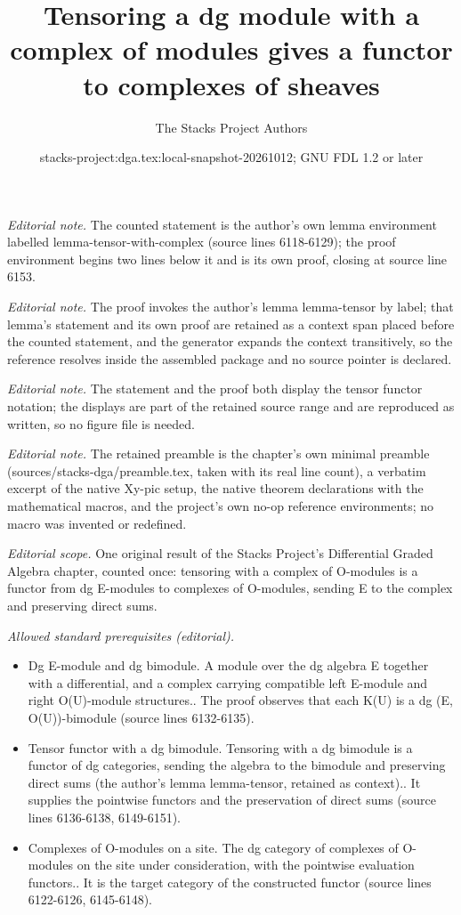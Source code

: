 \documentclass{stacks-project}
\title{Tensoring a dg module with a complex of modules gives a functor to complexes of sheaves}
\author{The Stacks Project Authors}
\date{stacks-project:dga.tex:local-snapshot-20261012; GNU FDL 1.2 or later}
\theoremstyle{plain}
\theoremstyle{definition}
\theoremstyle{remark}
\numberwithin{equation}{subsection}
\begin{document}
\maketitle
\noindent\textit{Editorial note.} The counted statement is the author's own lemma environment labelled lemma-tensor-with-complex (source lines 6118-6129); the proof environment begins two lines below it and is its own proof, closing at source line 6153.\par\medskip
\noindent\textit{Editorial note.} The proof invokes the author's lemma lemma-tensor by label; that lemma's statement and its own proof are retained as a context span placed before the counted statement, and the generator expands the context transitively, so the reference resolves inside the assembled package and no source pointer is declared.\par\medskip
\noindent\textit{Editorial note.} The statement and the proof both display the tensor functor notation; the displays are part of the retained source range and are reproduced as written, so no figure file is needed.\par\medskip
\noindent\textit{Editorial note.} The retained preamble is the chapter's own minimal preamble (sources/stacks-dga/preamble.tex, taken with its real line count), a verbatim excerpt of the native Xy-pic setup, the native theorem declarations with the mathematical macros, and the project's own no-op reference environments; no macro was invented or redefined.\par\medskip
\noindent\textit{Editorial scope.} One original result of the Stacks Project's Differential Graded Algebra chapter, counted once: tensoring with a complex of O-modules is a functor from dg E-modules to complexes of O-modules, sending E to the complex and preserving direct sums.\par\medskip
\noindent\textit{Allowed standard prerequisites (editorial).}\begin{itemize}
\item Dg E-module and dg bimodule. A module over the dg algebra E together with a differential, and a complex carrying compatible left E-module and right O(U)-module structures.. The proof observes that each K(U) is a dg (E, O(U))-bimodule (source lines 6132-6135).
\item Tensor functor with a dg bimodule. Tensoring with a dg bimodule is a functor of dg categories, sending the algebra to the bimodule and preserving direct sums (the author's lemma lemma-tensor, retained as context).. It supplies the pointwise functors and the preservation of direct sums (source lines 6136-6138, 6149-6151).
\item Complexes of O-modules on a site. The dg category of complexes of O-modules on the site under consideration, with the pointwise evaluation functors.. It is the target category of the constructed functor (source lines 6122-6126, 6145-6148).
\end{itemize}\medskip
\end{document}
